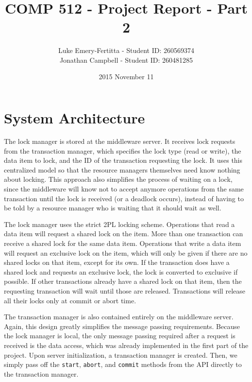 \documentclass[11pt]{article}
\begin{document}
\title{COMP 512 - Project Report - Part 2}
\author{Luke Emery-Fertitta - Student ID: 260569374 \\ Jonathan Campbell - Student ID: 260481285}
\date{2015 November 11}
\maketitle

\section*{System Architecture}

The lock manager is stored at the middleware server. It receives lock requests from the transaction manager, which specifies the lock type (read or write), the data item to lock, and the ID of the transaction requesting the lock. It uses this centralized model so that the resource managers themselves need know nothing about locking. This approach also simplifies the process of waiting on a lock, since the middleware will know not to accept anymore operations from the same transaction until the lock is received (or a deadlock occurs), instead of having to be told by a resource manager who is waiting that it should wait as well. \par

The lock manager uses the strict 2PL locking scheme. Operations that read a data item will request a shared lock on the item. More than one transaction can receive a shared lock for the same data item. Operations that write a data item will request an exclusive lock on the item, which will only be given if there are no shared locks on that item, except for its own. If the transaction does have a shared lock and requests an exclusive lock, the lock is converted to exclusive if possible. If other transactions already have a shared lock on that item, then the requesting transaction will wait until those are released. Transactions will release all their locks only at commit or abort time. \par

The transaction manager is also contained entirely on the middleware server. Again, this design greatly simplifies the message passing requirements. Because the lock manager is local, the only message passing required after a request is received is the data access, which was already implemented in the first part of the project. Upon server initialization, a transaction manager is created. Then, we simply pass off the \texttt{start}, \texttt{abort}, and \texttt{commit} methods from the API directly to the transaction manager. \par
\end{document}
